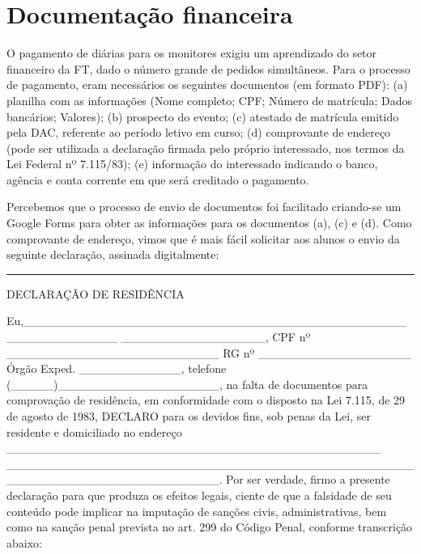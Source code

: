 \documentclass[
  letterpaper,
  DIV=11,
  numbers=noendperiod]{scrreprt}
\begin{document}
\section{Documentação financeira}\label{documentauxe7uxe3o-financeira}

O pagamento de diárias para os monitores exigiu um aprendizado do setor
financeiro da FT, dado o número grande de pedidos simultâneos. Para o
processo de pagamento, eram necessários os seguintes documentos (em
formato PDF): (a) planilha com as informações (Nome completo; CPF;
Número de matrícula; Dados bancários; Valores); (b) prospecto do evento;
(c) atestado de matrícula emitido pela DAC, referente ao período letivo
em curso; (d) comprovante de endereço (pode ser utilizada a declaração
firmada pelo próprio interessado, nos termos da Lei Federal nº
7.115/83); (e) informação do interessado indicando o banco, agência e
conta corrente em que será creditado o pagamento.

Percebemos que o processo de envio de documentos foi facilitado
criando-se um Google Forms para obter as informações para os documentos
(a), (c) e (d). Como comprovante de endereço, vimos que é mais fácil
solicitar aos alunos o envio da seguinte declaração, assinada
digitalmente:

\begin{center}\rule{0.5\linewidth}{0.5pt}\end{center}

DECLARAÇÃO DE RESIDÊNCIA

Eu,\_\_\_\_\_\_\_\_\_\_\_\_\_\_\_\_\_\_\_\_\_\_\_\_\_\_\_\_\_\_\_\_\_\_\_\_\_\_\_\_\_\_\_\_\_\_\_\_\_\_\_\_\_\_\_\_\_\_
\_\_\_\_\_\_\_\_\_\_\_\_\_\_\_\_\_, CPF nº
\_\_\_\_\_\_\_\_\_\_\_\_\_\_\_\_\_\_\_\_\_\_\_\_\_ RG nº
\_\_\_\_\_\_\_\_\_\_\_\_\_\_\_\_\_\_ Órgão Exped.
\_\_\_\_\_\_\_\_\_\_\_\_, telefone
(\_\_\_\_\_)\_\_\_\_\_\_\_\_\_\_\_\_\_\_\_\_\_\_\_, na falta de
documentos para comprovação de residência, em conformidade com o
disposto na Lei 7.115, de 29 de agosto de 1983, DECLARO para os devidos
fins, sob penas da Lei, ser residente e domiciliado no endereço
\_\_\_\_\_\_\_\_\_\_\_\_\_\_\_\_\_\_\_\_\_\_\_\_\_\_\_\_\_\_\_\_\_\_\_\_\_\_\_\_\_\_\_\_
\_\_\_\_\_\_\_\_\_\_\_\_\_\_\_\_\_\_\_\_\_\_\_\_\_\_\_\_\_\_\_\_\_\_\_\_\_\_\_\_\_\_\_\_\_\_\_\_\_\_\_\_\_\_\_\_\_\_\_\_\_\_\_\_\_\_\_\_\_\_\_\_\_.
Por ser verdade, firmo a presente declaração para que produza os efeitos
legais, ciente de que a falsidade de seu conteúdo pode implicar na
imputação de sanções civis, administrativas, bem como na sanção penal
prevista no art. 299 do Código Penal, conforme transcrição abaixo:
\end{document}

